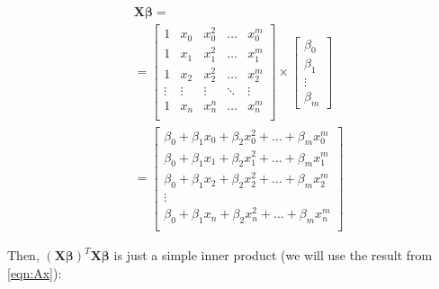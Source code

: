 \documentclass{article}
\newcommand{\X}{\mathbf{X}}
\newcommand{\B}{\boldsymbol\beta} %
\begin{document}
\begin{equation} \label{eqn:Ax}
\begin{split}
    & \X\B = \\
    & =
    \begin{bmatrix}
        1 & x_0 & x_0 ^2 & \ldots & x_0^m \\
        1 & x_1 & x_1 ^2 & \ldots & x_1^m \\
        1 & x_2 & x_2 ^2 & \ldots & x_2^m \\
        \vdots & \vdots & \vdots & \ddots & \vdots \\
        1 & x_n & x_n ^n & \ldots & x_n^m \\
    \end{bmatrix}
    \times
    \begin{bmatrix}
        \beta_0\\
        \beta_1\\
        \vdots\\
        \beta_m
    \end{bmatrix}\\
    & =
    \begin{bmatrix}
        \beta_0 + \beta_1 x_0 + \beta_2 x_0 ^2 + \ldots + \beta_m x_0^m \\
        \beta_0 + \beta_1 x_1 + \beta_2 x_1 ^2 + \ldots + \beta_m x_1^m \\
        \beta_0 + \beta_1 x_2 + \beta_2 x_2 ^2 + \ldots + \beta_m x_2^m \\
        \vdots \\
        \beta_0 + \beta_1 x_n + \beta_2 x_n ^2 + \ldots + \beta_m x_n^m \\
    \end{bmatrix}
\end{split}
\end{equation}

Then, $(\X\B)^T \X\B$ is just a simple inner product (we will use the result from \ref{eqn:Ax}):
\end{document}
